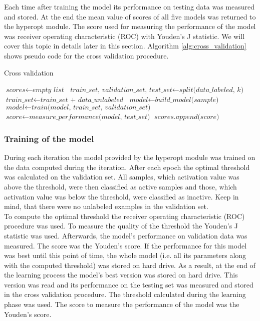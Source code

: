 \documentclass[a4paper,10pt]{report}
\begin{document}
	Each time after training the model its performance on testing data was measured and stored. At the end the mean value of scores of all five models was returned to the hyperopt module. The score used for measuring the performance of the model was receiver operating characteristic (ROC) with Youden's J statistic. We will cover this topic in details later in this section. Algorithm \ref{alg:cross_validation} shows pseudo code for the cross validation procedure.\\
	
	\begin{algorithm}
	\caption{Cross validation}\label{alg:cross_validation}
	\begin{algorithmic}[1]
	\State
	\State $\textit{scores} \gets \textit{empty list}$
	\State
	  \State $\textit{train\_set, validation\_set, test\_set} \gets \textit{split(data\_labeled, k)} $
	  \State $\textit{train\_set} \gets \textit{train\_set + data\_unlabeled}$
	  \State $\textit{model} \gets \textit{build\_model(sample)}$
	  \State $\textit{model} \gets \textit{train(model, train\_set, validation\_set)}$
	  \State $\textit{score} \gets \textit{measure\_performance(model, test\_set)}$
	  \State $\textit{scores.append(score)}$
	\EndFor
	\State       
	\State
	\EndProcedure
	\end{algorithmic}
	\end{algorithm}
	
	\subsubsection{Training of the model}
	During each iteration the model provided by the hyperopt module was trained on the data computed during the iteration. After each epoch the optimal threshold was calculated on the validation set. All samples, which activation value was above the threshold, were then classified as active samples and those, which activation value was below the threshold, were classified as inactive. Keep in mind, that there were no unlabeled examples in the validation set.\\
	
	To compute the optimal threshold the receiver operating characteristic (ROC) procedure was used. To measure the quality of the threshold the Youden's J statistic was used. Afterwards, the model's performance on validation data was measured. The score was the Youden's score. If the performance for this model was best until this point of time, the whole model (i.e. all its parameters along with the computed threshold) was stored on hard drive. As a result, at the end of the learning process the model's best version was stored on hard drive. This version was read and its performance on the testing set was measured and stored in the cross validation procedure. The threshold calculated during the learning phase was used. The score to measure the performance of the model was the Youden's score.\\
	
\end{document}
